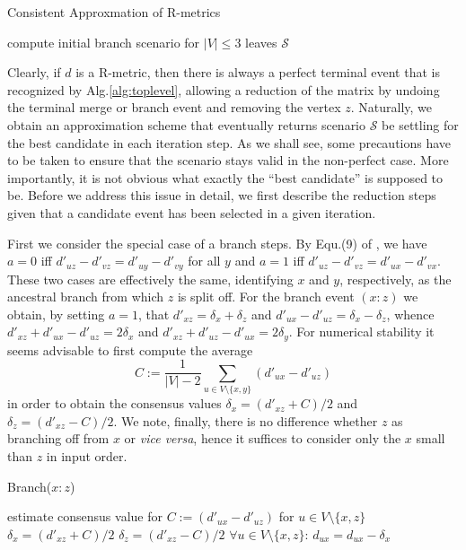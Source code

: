 \documentclass[amsmath]{lni}
\begin{document}
\begin{algorithm}[H]
\caption{Consistent Approxmation of R-metrics}
\label{alg:toplevel}
\SetAlgoLined
{}
compute initial branch scenario for $|V|\le 3$ leaves\;
\Return $\mathcal{S}$ 
\end{algorithm} 

Clearly, if $d$ is a R-metric, then there is always a perfect terminal
event that is recognized by Alg.\ref{alg:toplevel}, allowing a reduction of
the matrix by undoing the terminal merge or branch event and removing the
vertex $z$. Naturally, we obtain an approximation scheme that eventually
returns scenario $\mathcal{S}$ be settling for the best candidate in each
iteration step. As we shall see, some precautions have to be taken to
ensure that the scenario stays valid in the non-perfect case. More
importantly, it is not obvious what exactly the ``best candidate'' is
supposed to be. Before we address this issue in detail, we first describe
the reduction steps given that a candidate event has been selected in a
given iteration.

First we consider the special case of a branch steps. By Equ.(9) of
\cite{Prohaska:17a}, we have $a=0$ iff $d'_{uz}-d'_{vz} = d'_{uy}-d'_{vy}$
for all $y$ and $a=1$ iff $d'_{uz}-d'_{vz} = d'_{ux}-d'_{vx}$. These two
cases are effectively the same, identifying $x$ and $y$, respectively, as
the ancestral branch from which $z$ is split off. For the branch event
$(x:z)$ we obtain, by setting $a=1$, that $d'_{xz}=\delta_x+\delta_z$ and
$d'_{ux}-d'_{uz}=\delta_x-\delta_z$, whence
$d'_{xz}+d'_{ux}-d'_{uz}=2\delta_x$ and
$d'_{xz}+d'_{uz}-d'_{ux}=2\delta_y$. For numerical stability it seems
advisable to first compute the average
\begin{equation} 
  C := \frac{1}{|V|-2} \sum_{u\in V\setminus\{x,y\}} (d'_{ux}-d'_{uz})
\end{equation} 
in order to obtain the consensus values $\delta_x = (d'_{xz}+C)/2$ and
$\delta_z = (d'_{xz}-C)/2$.  We note, finally, there is no difference
whether $z$ as branching off from $x$ or \textit{vice versa}, hence it
suffices to consider only the $x$ small than $z$ in input order. 

\begin{algorithm}[H]
\caption{Branch($x:z$)} 
\label{alg:branchstep}
\SetAlgoLined
estimate consensus value for $C:=(d'_{ux}-d'_{uz})$ for $u\in
V\setminus\{x,z\}$ \;
$\delta_x = (d'_{xz}+C)/2$\;
$\delta_z = (d'_{xz}-C)/2$\;
$\forall u\in V\setminus\{x,z\}$: $d_{ux} =  d_{ux}-\delta_x$\;
\end{algorithm} 
\end{document}
